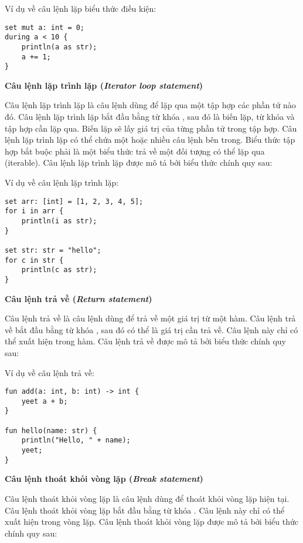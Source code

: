 \regexpredloopstmt

\noindent Ví dụ về câu lệnh lặp biểu thức điều kiện:
\begin{lstlisting}[]
set mut a: int = 0;
during a < 10 {
    println(a as str);
    a += 1;
}
\end{lstlisting}

\noindent\textbf{\label{ch2:for_stmt}Câu lệnh lặp trình lặp (\textit{Iterator loop statement})}

    Câu lệnh lặp trình lặp là câu lệnh dùng để lặp qua một tập hợp các phần tử nào đó. Câu lệnh lặp trình lặp bắt đầu bằng từ khóa , sau đó là biến lặp, từ khóa  và tập hợp cần lặp qua. Biến lặp sẽ lấy giá trị của từng phần tử trong tập hợp. Câu lệnh lặp trình lặp có thể chứa một hoặc nhiều câu lệnh bên trong. Biểu thức tập hợp bắt buộc phải là một biểu thức trả về một đối tượng có thể lặp qua (iterable). Câu lệnh lặp trình lặp được mô tả bởi biểu thức chính quy sau:

\regexiterloopstmt

\noindent Ví dụ về câu lệnh lặp trình lặp:
\begin{lstlisting}[]
set arr: [int] = [1, 2, 3, 4, 5];
for i in arr {
    println(i as str);
}

set str: str = "hello";
for c in str {
    println(c as str);
}
\end{lstlisting}

\noindent\textbf{Câu lệnh trả về (\textit{Return statement})}

    Câu lệnh trả về là câu lệnh dùng để trả về một giá trị từ một hàm. Câu lệnh trả về bắt đầu bằng từ khóa , sau đó có thể là giá trị cần trả về. Câu lệnh này chỉ có thể xuất hiện trong hàm. Câu lệnh trả về được mô tả bởi biểu thức chính quy sau:

\regexreturnstmt

\noindent Ví dụ về câu lệnh trả về:
\begin{lstlisting}[]
fun add(a: int, b: int) -> int {
    yeet a + b;
}

fun hello(name: str) {
    println("Hello, " + name);
    yeet;
}
\end{lstlisting}

\noindent\textbf{Câu lệnh thoát khỏi vòng lặp (\textit{Break statement})}

    Câu lệnh thoát khỏi vòng lặp là câu lệnh dùng để thoát khỏi vòng lặp hiện tại. Câu lệnh thoát khỏi vòng lặp bắt đầu bằng từ khóa . Câu lệnh này chỉ có thể xuất hiện trong vòng lặp. Câu lệnh thoát khỏi vòng lặp được mô tả bởi biểu thức chính quy sau:

